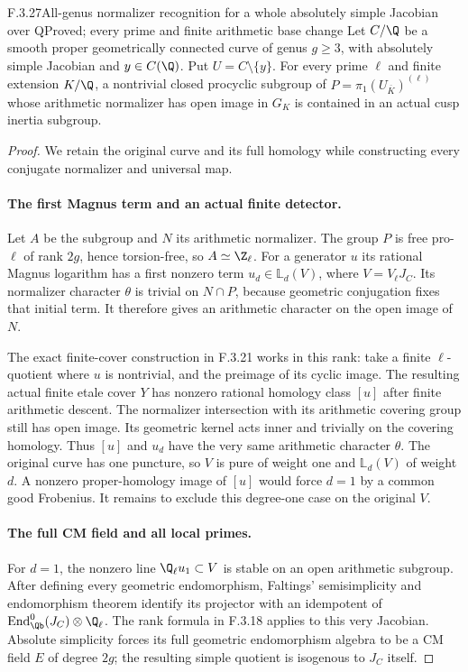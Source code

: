 \begin{result}{F.3.27}{All-genus normalizer recognition for a whole absolutely simple Jacobian over Q}{Proved; every prime and finite arithmetic base change}
Let $C/\Q$ be a smooth proper geometrically connected curve
of genus $g\geq3$, with absolutely simple Jacobian and
$y\in C(\Q)$. Put $U=C\setminus\{y\}$.
For every prime $\ell$ and finite extension $K/\Q$,
a nontrivial closed procyclic subgroup of
$P=\pi_1(U_{\overline K})^{(\ell)}$ whose arithmetic
normalizer has open image in $G_K$ is contained in
an actual cusp inertia subgroup.
\end{result}
\begin{proof}
We retain the original curve and its full homology while
constructing every conjugate normalizer and universal map.

\paragraph{The first Magnus term and an actual finite detector.}
Let $A$ be the subgroup and $N$ its arithmetic normalizer.
The group $P$ is free pro-$\ell$ of rank $2g$, hence
torsion-free, so $A\simeq\Z_\ell$. For a generator $u$
its rational Magnus logarithm has a first nonzero term
$u_d\in\mathbb L_d(V)$, where $V=V_\ell J_C$.
Its normalizer character $\theta$ is trivial on
$N\cap P$, because geometric conjugation fixes that
initial term. It therefore gives an arithmetic
character on the open image of $N$.

The exact finite-cover construction in F.3.21 works
in this rank: take a finite $\ell$-quotient where
$u$ is nontrivial, and the preimage of its cyclic
image. The resulting actual finite etale cover $Y$
has nonzero rational homology class $[u]$ after
finite arithmetic descent. The normalizer intersection
with its arithmetic covering group still has open
image. Its geometric kernel acts inner and trivially
on the covering homology. Thus $[u]$ and $u_d$
have the very same arithmetic character $\theta$.
The original curve has one puncture, so $V$ is
pure of weight one and $\mathbb L_d(V)$ of weight
$d$. A nonzero proper-homology image of $[u]$
would force $d=1$ by a common good Frobenius.
It remains to exclude this degree-one case on
the original $V$.

\paragraph{The full CM field and all local primes.}
For $d=1$, the nonzero line $\Q_\ell u_1\subset V$
is stable on an open arithmetic subgroup. After
defining every geometric endomorphism, Faltings'
semisimplicity and endomorphism theorem identify
its projector with an idempotent of
$\operatorname{End}^0_{\Qb}(J_C)\otimes\Q_\ell$.
The rank formula in F.3.18 applies to this very
Jacobian. Absolute simplicity forces its full
geometric endomorphism algebra to be a CM field
$E$ of degree $2g$; the resulting simple quotient
is isogenous to $J_C$ itself.


\end{proof}
